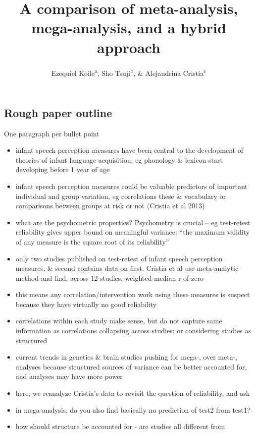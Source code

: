 \documentclass[man]{apa6}
\title{A comparison of meta-analysis, mega-analysis, and a hybrid approach}
\author{Ezequiel Koile\textsuperscript{a}, Sho Tsuji\textsuperscript{b}, \&
Alejandrina Cristia\textsuperscript{c}}
\date{}
\affiliation{
\vspace{0.5cm}
\textsuperscript{a} ADD\\\textsuperscript{b} ADD\\\textsuperscript{c} ADD}
\begin{document}
\maketitle

\subsection{Rough paper outline}\label{rough-paper-outline}

One paragraph per bullet point

\begin{itemize}
\item
  infant speech perception measures have been central to the development
  of theories of infant language acquisition, eg phonology \& lexicon
  start developing before 1 year of age
\item
  infant speech perception measures could be valuable predictors of
  important individual and group variation, eg correlations these \&
  vocabulary or comparisons between groups at risk or not (Cristia et al
  2013)
\item
  what are the psychometric properties? Psychometry is crucial -- eg
  test-retest reliability gives upper bound on meaningful variance:
  \enquote{the maximum validity of any measure is the square root of its
  reliability}
\item
  only two studies published on test-retest of infant speech perception
  measures, \& second contains data on first. Cristia et al use
  meta-analytic method and find, across 12 studies, weighted median r of
  zero
\item
  this means any correlation/intervention work using these measures is
  suspect because they have virtually no good reliability
\item
  correlations within each study make sense, but do not capture same
  information as correlations collapsing across studies; or considering
  studies as structured
\item
  current trends in genetics \& brain studies pushing for mega-, over
  meta-, analyses because structured sources of variance can be better
  accounted for, and analyses may have more power
\item
  here, we reanalyze Cristia's data to revisit the question of
  reliability, and ask
\item
  in mega-analysis, do you also find basically no prediction of test2
  from test1?
\item
  how should structure be accounted for - are studies all different from

\end{itemize}
\end{document}
